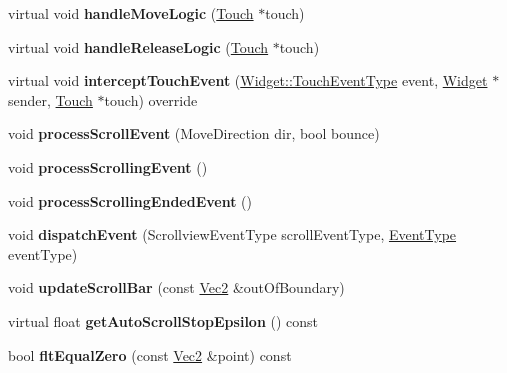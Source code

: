\begin{DoxyCompactItemize}
virtual void {\bfseries handle\+Move\+Logic} (\hyperlink{classTouch}{Touch} $\ast$touch)
\item 
\mbox{\label{classui_1_1ScrollView_a760e6d2e4d7728ed0abe87ae14830444}} 
virtual void {\bfseries handle\+Release\+Logic} (\hyperlink{classTouch}{Touch} $\ast$touch)
\item 
\mbox{\label{classui_1_1ScrollView_a9bfeaabaf70e4104e163712c0718c012}} 
virtual void {\bfseries intercept\+Touch\+Event} (\hyperlink{classui_1_1Widget_a4829c0f1cbaf1fd820a9b2ccf0c58c73}{Widget\+::\+Touch\+Event\+Type} event, \hyperlink{classui_1_1Widget}{Widget} $\ast$sender, \hyperlink{classTouch}{Touch} $\ast$touch) override
\item 
\mbox{\label{classui_1_1ScrollView_a875eaf13f066614905505f8a64344caf}} 
void {\bfseries process\+Scroll\+Event} (Move\+Direction dir, bool bounce)
\item 
\mbox{\label{classui_1_1ScrollView_aa776a655366bf9f54acc400818f8ebfd}} 
void {\bfseries process\+Scrolling\+Event} ()
\item 
\mbox{\label{classui_1_1ScrollView_a5527a0bd7626f28b46ea8358451893c8}} 
void {\bfseries process\+Scrolling\+Ended\+Event} ()
\item 
\mbox{\label{classui_1_1ScrollView_a27264eb525d93412e67d0782b4f80bb6}} 
void {\bfseries dispatch\+Event} (Scrollview\+Event\+Type scroll\+Event\+Type, \hyperlink{classui_1_1ScrollView_ac2a08f5665cbbfbff86fe7abdb6fbb02}{Event\+Type} event\+Type)
\item 
\mbox{\label{classui_1_1ScrollView_a18536fa27c4fac60511e1194afea7118}} 
void {\bfseries update\+Scroll\+Bar} (const \hyperlink{classVec2}{Vec2} \&out\+Of\+Boundary)
\item 
\mbox{\label{classui_1_1ScrollView_a28b43e41bd2768eedc121c12596e05a8}} 
virtual float {\bfseries get\+Auto\+Scroll\+Stop\+Epsilon} () const
\item 
\mbox{\label{classui_1_1ScrollView_ac51505566013c4925a407a1b33b8b36a}} 
bool {\bfseries flt\+Equal\+Zero} (const \hyperlink{classVec2}{Vec2} \&point) const
\end{DoxyCompactItemize}
